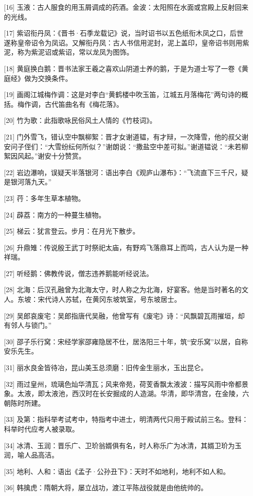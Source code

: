 \documentclass[12pt,UTF8]{ctexbook}
\begin{document}
[16] 玉液：古人服食的用玉屑调成的药酒。金波：太阳照在水面或宫殿上反射回来的光线。

[17] 紫诏衔丹凤：《晋书·石季龙载记》说，当时诏书以五色纸衔木凤之口，后世遂称皇帝诏令为凤诏。又解衔丹凤：古人书信用泥封，泥上盖印，皇帝诏书则用紫泥，称为紫泥诏或紫诏，常以龙凤为图饰。

[18] 黄庭换白鹅：晋书法家王羲之喜欢山阴道士养的鹅，于是为道士写了一卷《黄庭经》做为交换条件。

[19] 画阁江城梅作调：这是对李白“黄鹤楼中吹玉笛，江城五月落梅花”两句诗的概括。梅作调，古代笛曲名有《梅花落》。

[20] 竹为歌：此指歌咏民俗风土人情的《竹枝词》。

[21] 门外雪飞，错认空中飘柳絮：晋才女谢道韫，有才辩，一次降雪，他的叔父谢安问子侄们：“大雪纷纭何所似？”谢朗说：“撒盐空中差可拟。”谢道韫说：“未若柳絮因风起。”谢安十分赞赏。

[22] 岩边瀑响，误疑天半落银河：语出李白《观庐山瀑布》：“飞流直下三千尺，疑是银河落九天。”

[23] 荇：多年生草本植物。

[24] 薜荔：南方的一种蔓生植物。

[25] 梯云：犹言登云。步月：在月光下散步。

[26] 升鼎雉：传说殷王武丁时祭祀太庙，有野鸡飞落鼎耳上而鸣，古人认为是一种祥瑞。

[27] 听经鹅：佛教传说，僧志违养鹅能听经说法。

[28] 北海：后汉孔融曾为北海太守，时人称之为北海，好宴客。他是当时著名的文人。东坡：宋代诗人苏轼，在黄冈东坡筑室，号东坡居士。

[29] 吴郎哀废宅：吴郎指唐代吴融，他曾写有《废宅》诗：“风飘碧瓦雨摧垣，却有邻人与锁门。”

[30] 邵子乐行窝：宋经学家邵雍隐居不仕，居洛阳三十年，筑“安乐窝”以居，自称安乐先生。

[31] 丽水良金皆待冶，昆山美玉总须磨：旧传金生丽水，玉出昆仑。

[32] 雨过皇州，琉璃色灿华清瓦；风来帝苑，荷芰香飘太液波：描写风雨中帝都景象。太液，即太液池，西汉时在长安掘成的人造湖。华清，即华清宫，在金陵，六朝陈时所建。

[33] 及第：指科举考试考中，特指考中进士，明清两代只用于殿试前三名。登科：科举时代应考人被录取。

[34] 冰清、玉润：晋乐广、卫玠翁婿俱有名，时人称乐广为冰清，其婿卫玠为玉润，喻人品高洁。

[35] 地利、人和：语出《孟子·公孙丑下》：天时不如地利，地利不如人和。

[36] 韩擒虎：隋朝大将，屡立战功，渡江平陈战役就是由他统帅的。
\end{document}
